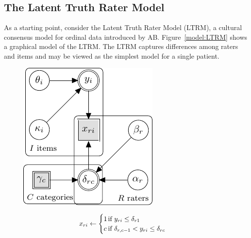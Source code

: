 \documentclass[a4paper]{article}
\newcommand{\AB}{AB}
\begin{document}
\subsection*{The Latent Truth Rater Model}
As a starting point, consider the Latent Truth Rater Model (LTRM), a cultural consensus model for ordinal data introduced by \AB{}. Figure~\ref{model:LTRM} shows a graphical model of the LTRM. The LTRM captures differences among raters and items and may be viewed as the simplest model for a single patient.
\begin{figure}[!ht]
	\begin{minipage}{0.5\textwidth}
		\centering
		\includegraphics[width=\textwidth, page=7]{graphicalModels/graphicalModels.pdf}
		\end{minipage}\hfill
	\begin{minipage}{0.5\textwidth}
		{\normalsize
		\begin{align*}
			x_{\Irater\Iitem} &\leftarrow
			\begin{cases}
			1		&\hspace{-.3cm} \text{if } \Appraisal_{\Irater\Iitem} \leq \Threshold_{\Irater 1} \\
			\Incat	&\hspace{-.3cm} \text{if } \Threshold_{\Irater, \Incat-1} < \Appraisal_{\Irater\Iitem} \leq \Threshold_{\Irater\Incat} \\

\end{cases}
\end{align*}}
\end{minipage}
\end{figure}
\end{document}
